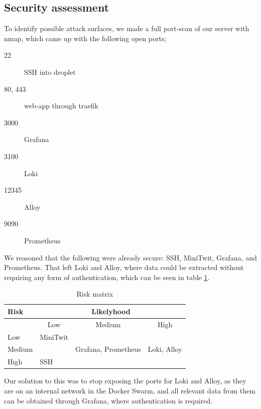 \subsection{Security assessment} %
To identify possible attack surfaces, we made a full port-scan of our server with nmap, which came up with the following open ports;
\begin{description}
    \item[22] SSH into droplet
    \item[80, 443] web-app through traefik
    \item[3000] Grafana
    \item[3100] Loki
    \item[12345] Alloy
    \item[9090] Prometheus
\end{description}
We reasoned that the following were already secure: SSH, MiniTwit, Grafana, and Prometheus. That left Loki and Alloy, where data could be extracted without requiring any form of authentication, which can be seen in table \ref{tab:risk-matrix}. 
\begin{table}[h!]
\centering
\begin{tabular}{|l|lll|}
\hline
\textbf{Risk}   & \multicolumn{3}{c|}{\textbf{Likelyhood}}                                                                    \\ \hline
       & \multicolumn{1}{c|}{Low}                 & \multicolumn{1}{c|}{Medium} & \multicolumn{1}{c|}{High} \\ \hline
Low    & \multicolumn{1}{l|}{MiniTwit}             & \multicolumn{1}{l|}{}       &                           \\ \hline
Medium & \multicolumn{1}{l|}{} & \multicolumn{1}{l|}{Grafana, Prometheus}       & Loki, Alloy               \\ \hline
High   & \multicolumn{1}{l|}{SSH}                 & \multicolumn{1}{l|}{}       &                           \\ \hline
\end{tabular}
\caption{Risk matrix}
\label{tab:risk-matrix}
\end{table}

Our solution to this was to stop exposing the ports for Loki and Alloy, as they are on an internal network in the Docker Swarm, and all relevant data from them can be obtained through Grafana, where authentication is required.

